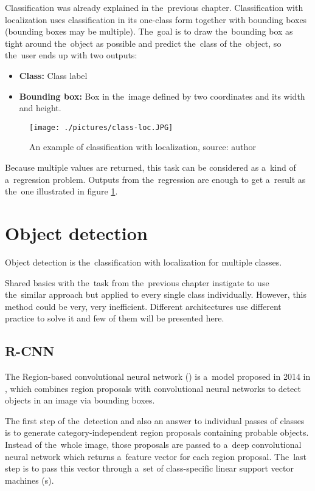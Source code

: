 Classification was already explained in the~previous chapter. Classification 
with localization uses classification in its one-class form together with 
bounding boxes (bounding boxes may be multiple). The~goal is to draw
the~bounding box as tight around the~object as possible and predict the~class of
the~object, so the~user ends up with two outputs:
\begin{itemize}
	\item \textbf{Class:} Class label
	\item \textbf{Bounding box:} Box in the~image defined by two coordinates and
	its width and height.
\end{itemize}

\begin{figure}[H]
   \centering
   \texttt{[image: ./pictures/class-loc.JPG]}
	\caption[Classification with localization example]{An example of classification 
	with localization, source: author}
      \label{fig:class-loc}
\end{figure}

Because multiple values are returned, this task can be considered as a~kind of
a~regression problem. Outputs from the~regression are enough to get a~result as 
the~one illustrated in figure \ref{fig:class-loc}. 

\section{Object detection}
\label{object-detection}

Object detection is the~classification with localization for multiple classes.

Shared basics with the~task from the~previous chapter instigate to use
the~similar approach but applied to every single class individually. However, this 
method could be very, very inefficient. Different architectures use different 
practice to solve it and few of them will be presented here.

\subsection{R-CNN}
\label{r-cnn}

The Region-based convolutional neural network () is a~model proposed 
in 2014 in \cite{rcnn}, which combines region proposals with convolutional 
neural networks to detect objects in an image via bounding boxes. 

The first step of the~detection and also an answer to individual passes of 
classes is to generate category-independent region proposals containing probable 
objects. Instead of the~whole image, those proposals are passed to a~deep 
convolutional neural network which returns a~feature vector for each region 
proposal. The~last step is to pass this vector through a~set of class-specific 
linear support vector machines (s).


